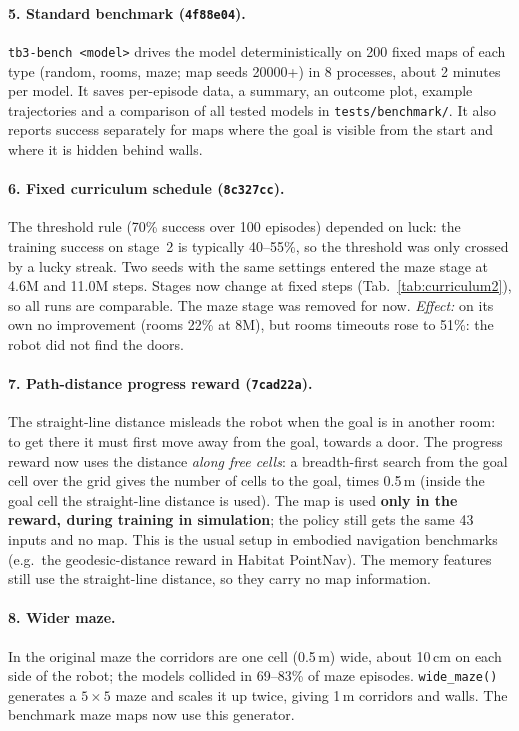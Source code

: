 \documentclass[11pt,a4paper]{article}
\newcommand{\code}[1]{\texttt{#1}}
\begin{document}
\paragraph{5. Standard benchmark (\code{4f88e04}).}
\code{tb3-bench <model>} drives the model deterministically on 200 fixed maps
of each type (random, rooms, maze; map seeds 20000+) in 8 processes, about
2 minutes per model. It saves per-episode data, a summary, an outcome plot,
example trajectories and a comparison of all tested models in
\code{tests/benchmark/}. It also reports success separately for maps where
the goal is visible from the start and where it is hidden behind walls.

\paragraph{6. Fixed curriculum schedule (\code{8c327cc}).}
The threshold rule (70\% success over 100 episodes) depended on luck: the
training success on stage~2 is typically 40--55\%, so the threshold was only
crossed by a lucky streak. Two seeds with the same settings entered the maze
stage at 4.6M and 11.0M steps. Stages now change at fixed steps
(Tab.~\ref{tab:curriculum2}), so all runs are comparable. The maze stage was
removed for now. \emph{Effect:} on its own no improvement (rooms 22\% at 8M),
but rooms timeouts rose to 51\%: the robot did not find the doors.

\paragraph{7. Path-distance progress reward (\code{7cad22a}).}
The straight-line distance misleads the robot when the goal is in another
room: to get there it must first move away from the goal, towards a door.
The progress reward now uses the distance \emph{along free cells}: a
breadth-first search from the goal cell over the grid gives the number of
cells to the goal, times 0.5\,m (inside the goal cell the straight-line
distance is used). The map is used \textbf{only in the reward, during
      training in simulation}; the policy still gets the same 43 inputs and no map.
This is the usual setup in embodied navigation benchmarks (e.g.\ the
geodesic-distance reward in Habitat PointNav). The memory features still use
the straight-line distance, so they carry no map information.

\paragraph{8. Wider maze.}
In the original maze the corridors are one cell (0.5\,m) wide, about 10\,cm on
each side of the robot; the models collided in 69--83\% of maze episodes.
\code{wide\_maze()} generates a $5\times5$ maze and scales it up twice, giving
1\,m corridors and walls. The benchmark maze maps now use this generator.
\end{document}
